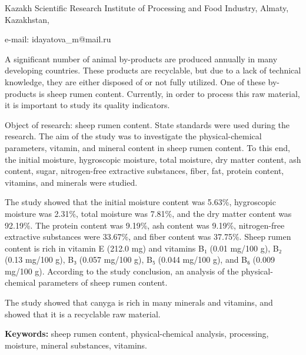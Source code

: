 \begin{affil}
Kazakh Scientific Research Institute of Processing and Food Industry, Almaty, Kazakhstan,

e-mail: idayatova\_m@mail.ru
\end{affil}

A significant number of animal by-products are produced annually in many
developing countries. These products are recyclable, but due to a lack
of technical knowledge, they are either disposed of or not fully
utilized. One of these by-products is sheep rumen content. Currently, in
order to process this raw material, it is important to study its quality
indicators.

Object of research: sheep rumen content. State standards were used
during the research. The aim of the study was to investigate the
physical-chemical parameters, vitamin, and mineral content in sheep
rumen content. To this end, the initial moisture, hygroscopic moisture,
total moisture, dry matter content, ash content, sugar, nitrogen-free
extractive substances, fiber, fat, protein content, vitamins, and
minerals were studied.

The study showed that the initial moisture content was 5.63\%,
hygroscopic moisture was 2.31\%, total moisture was 7.81\%, and the dry
matter content was 92.19\%. The protein content was 9.19\%, ash content
was 9.19\%, nitrogen-free extractive substances were 33.67\%, and fiber
content was 37.75\%. Sheep rumen content is rich in vitamin E (212.0 mg)
and vitamins B₁ (0.01 mg/100 g), B₂ (0.13 mg/100 g), B₃ (0.057 mg/100
g), B₅ (0.044 mg/100 g), and B₆ (0.009 mg/100 g). According to the study
conclusion, an analysis of the physical-chemical parameters of sheep
rumen content.

The study showed that canyga is rich in many minerals and vitamins, and
showed that it is a recyclable raw material.

{\bfseries Keywords:} sheep rumen content, physical-chemical analysis,
processing, moisture, mineral substances, vitamins.

